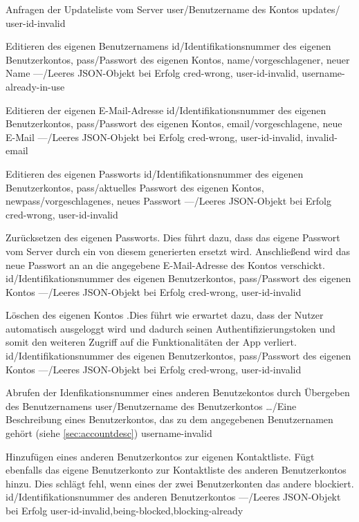 \documentclass[parskip=full,11pt]{scrartcl}
\begin{document}
{Anfragen der Updateliste vom Server}
{user/Benutzername des Kontos}
{updates/} %
{user-id-invalid}

{Editieren des eigenen Benutzernamens}
{id/Identifikationsnummer des eigenen Benutzerkontos,
pass/Passwort des eigenen Kontos,
name/vorgeschlagener{,} neuer Name}
{---/Leeres JSON-Objekt bei Erfolg}
{cred-wrong, user-id-invalid, username-already-in-use}

{Editieren der eigenen E-Mail-Adresse}
{id/Identifikationsnummer des eigenen Benutzerkontos,
pass/Passwort des eigenen Kontos,
email/vorgeschlagene{,} neue E-Mail}
{---/Leeres JSON-Objekt bei Erfolg}
{cred-wrong, user-id-invalid, invalid-email}\

{Editieren des eigenen Passworts}
{id/Identifikationsnummer des eigenen Benutzerkontos,
pass/aktuelles Passwort des eigenen Kontos,
newpass/vorgeschlagenes{,} neues Passwort}
{---/Leeres JSON-Objekt bei Erfolg}
{cred-wrong, user-id-invalid}

{Zurücksetzen des eigenen Passworts. Dies führt dazu, dass das eigene Passwort
vom Server durch ein von diesem generierten ersetzt wird. Anschließend wird das
neue Passwort an an die angegebene E-Mail-Adresse des Kontos verschickt.}
{id/Identifikationsnummer des eigenen Benutzerkontos,
pass/Passwort des eigenen Kontos}
{---/Leeres JSON-Objekt bei Erfolg}
{cred-wrong, user-id-invalid}

{Löschen des eigenen Kontos .Dies führt wie erwartet dazu{,}
dass der Nutzer automatisch ausgeloggt wird und dadurch seinen
Authentifizierungstoken und somit den weiteren Zugriff auf die Funktionalitäten
der App verliert.}
{id/Identifikationsnummer des eigenen Benutzerkontos,
pass/Passwort des eigenen Kontos}
{---/Leeres JSON-Objekt bei Erfolg}
{cred-wrong, user-id-invalid}

{Abrufen der Idenfikationsnummer eines anderen Benutzekontos durch Übergeben
des Benutzernamens}
{user/Benutzername des Benutzerkontos}
{\dots/Eine Beschreibung eines Benutzerkontos{,} das zu dem angegebenen
Benutzernamen gehört (siehe \ref{sec:accountdesc})}
{username-invalid}

{Hinzufügen eines anderen Benutzerkontos zur eigenen Kontaktliste.
Fügt ebenfalls das eigene Benutzerkonto zur Kontaktliste des anderen
Benutzerkontos hinzu.
Dies schlägt fehl, wenn eines der zwei Benutzerkonten das andere blockiert.}
{id/Identifikationsnummer des anderen Benutzerkontos}
{---/Leeres JSON-Objekt bei Erfolg}
{user-id-invalid,being-blocked,blocking-already}
\end{document}
